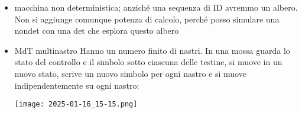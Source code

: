 	\begin{itemize}
		\item macchina non deterministica; anziché una sequenza di ID avremmo un albero. Non si aggiunge comunque potenza di calcolo, perché posso simulare una nondet con una det che esplora questo albero
		\item MdT multinastro
		      Hanno un numero finito di nastri. In una mossa guarda lo stato del controllo e il simbolo sotto ciascuna delle testine, si muove in un nuovo stato, scrive un nuovo simbolo per ogni nastro e si muove indipendentemente su ogni nastro:
		      \begin{center}
		\texttt{[image: 2025-01-16\_15-15.png]}



\end{center}
\end{itemize}
